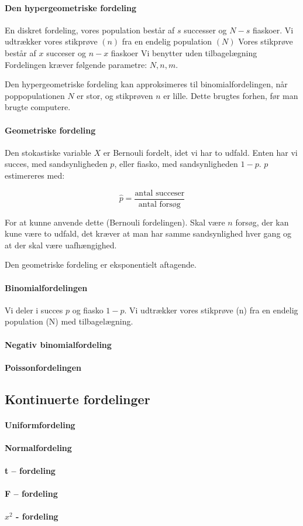 \documentclass{article}
\begin{document}
\paragraph{Den hypergeometriske fordeling}
En diskret fordeling, vores population består af $s$ successer og $N-s$
fiaskoer. Vi udtrækker vores stikprøve $(n)$ fra en endelig population $(N)$
Vores stikprøve består af $x$ succeser og $n-x$ fiaskoer Vi benytter uden
tilbagelægning Fordelingen kræver følgende parametre: $N, n, m$.


Den hypergeometriske fordeling kan approksimeres til binomialfordelingen, når
poppopulationen $N$ er stor, og stikprøven $n$ er lille. Dette brugtes forhen,
før man brugte computere.

\paragraph{Geometriske fordeling}
Den stokastiske variable $X$ er Bernouli fordelt, idet vi har to udfald. Enten
har vi succes, med sandsynligheden $p$, eller fiasko, med sandsynligheden $1-p$.
$p$ estimereres med:

$$\hat{p} = \frac{\text{antal succeser}}{\text{antal forsøg}}$$

For at kunne anvende dette (Bernouli fordelingen). Skal være $n$ forsøg, der kan
kune være to udfald, det kræver at man har samme sandsynlighed hver gang og at
der skal være uafhængighed. 

Den geometriske fordeling er eksponentielt aftagende.
\paragraph{Binomialfordelingen}
Vi deler i succes $p$ og fiasko $1-p$. Vi udtrækker vores stikprøve (n) fra en
endelig population (N) med tilbagelægning.


\paragraph{Negativ binomialfordeling}
\paragraph{Poissonfordelingen}

\subsection{Kontinuerte fordelinger}
\paragraph{Uniformfordeling}
\paragraph{Normalfordeling}
\paragraph{t – fordeling}
\paragraph{F – fordeling}
\paragraph{$x^2$  - fordeling}
\end{document}
